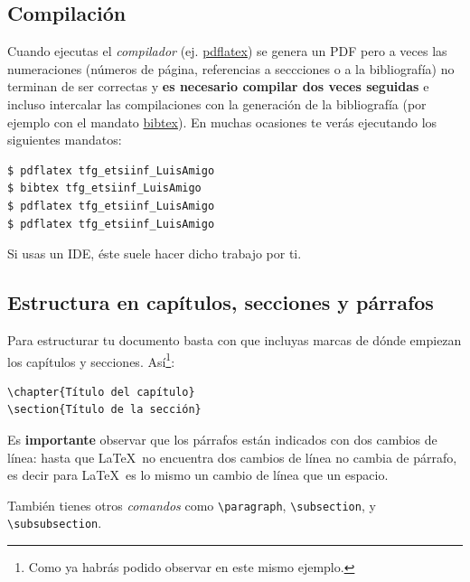 \subsection{Compilación}

Cuando ejecutas el \emph{compilador} (ej. \url{pdflatex}) se genera un
PDF pero a veces las numeraciones (números de página, referencias a
seccciones o a la bibliografía) no terminan de ser correctas y
\textbf{es necesario compilar dos veces seguidas} e incluso intercalar
las compilaciones con la generación de la bibliografía (por ejemplo
con el mandato \url{bibtex}). En muchas ocasiones te verás ejecutando
los siguientes mandatos:

\begin{verbatim}
$ pdflatex tfg_etsiinf_LuisAmigo
$ bibtex tfg_etsiinf_LuisAmigo
$ pdflatex tfg_etsiinf_LuisAmigo
$ pdflatex tfg_etsiinf_LuisAmigo
\end{verbatim}

Si usas un IDE, éste suele hacer dicho trabajo por ti.

\subsection{Estructura en capítulos, secciones y párrafos}

Para estructurar tu documento basta con que incluyas marcas de dónde
empiezan los capítulos y secciones. Así\footnote{Como ya habrás podido
  observar en este mismo ejemplo.}:

\begin{verbatim}
\chapter{Título del capítulo}
\section{Título de la sección}
\end{verbatim}

Es \textbf{importante} observar que los párrafos están indicados con
dos cambios de línea: hasta que \LaTeX\ no encuentra dos cambios de
línea no cambia de párrafo, es decir para \LaTeX\ es lo mismo un
cambio de línea que un espacio.

También tienes otros \emph{comandos} como \verb|\paragraph|,
\verb|\subsection|, y \verb|\subsubsection|.

